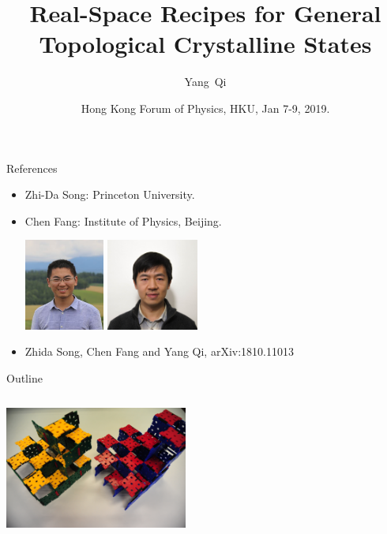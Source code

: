 \documentclass[xcolor=table, 11pt, aspectratio=169]{beamer}
\title[Space-group SPTs] %
{Real-Space Recipes for General Topological Crystalline States}
\author[Y Qi] %
{Yang~Qi}
\institute[Fudan] %
{Department of Physics, Fudan University}
\date{Hong Kong Forum of Physics, HKU, Jan 7-9, 2019.}
\begin{document}
\begin{frame}
  \titlepage
\end{frame}

\begin{frame}{References}
\begin{itemize}
\item Zhi-Da Song: Princeton University.
\item Chen Fang: Institute of Physics, Beijing.
\begin{center}
	\includegraphics[height=3cm]{../people/zhidasong}
	\includegraphics[height=3cm]{../people/chenfang}
\end{center}
\item Zhida Song, Chen Fang and Yang Qi, arXiv:1810.11013
\end{itemize}
\end{frame}

\begin{frame}{Outline}
	\begin{columns}
		\begin{column}[t]{.45\textwidth}
		\begin{center}
			\includegraphics[height=4cm]{toys}
		\end{center}
	\end{column}
	\begin{minipage}[t][0.5\textheight]{0.55\textwidth}
      \tableofcontents
    \end{minipage}\hfill
	\end{columns}
\end{frame}
\end{document}
